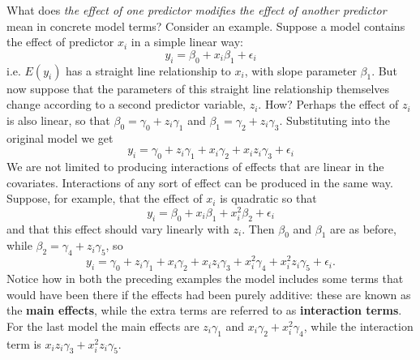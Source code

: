 \documentclass[10pt] {article}
\theoremstyle{definition}
\begin{document}
What does {\em  the effect of one predictor modifies the effect of another predictor} mean in concrete model terms? Consider an example. Suppose a model contains the effect of predictor $x_i$ in a simple linear way:
$$
y_i = \beta_0 + x_i \beta_1 + \epsilon_i
$$    
i.e. $E(y_i)$ has a straight line relationship to $x_i$, with slope parameter $\beta_1$. But now suppose that the parameters of this straight line relationship themselves change according to a second predictor variable, $z_i$. How? Perhaps the effect of $z_i$ is also linear, so that $\beta_0 = \gamma_0 + z_i \gamma_1$ and $\beta_1 = \gamma_2 + z_i \gamma_3$. Substituting into the original model we get
$$
y_i = \gamma_0 + z_i \gamma_1 + x_i \gamma_2  +  x_i z_i \gamma_3 + \epsilon_i
$$  
We are not limited to producing interactions of effects that are linear in the covariates. Interactions of any sort of effect can be produced in the same way. Suppose, for example, that the effect of $x_i$ is quadratic so that 
$$
y_i = \beta_0 + x_i \beta_1 +  x_i^2 \beta_2  + \epsilon_i
$$
and that this effect should vary linearly with $z_i$. Then $\beta_0$ and $\beta_1$ are as before, while $\beta_2 = \gamma_4 + z_i \gamma_5$, so
$$
y_i = \gamma_0 + z_i \gamma_1 + x_i \gamma_2  +  x_i z_i \gamma_3 + x_i^2 \gamma_4 + x_i^2 z_i \gamma_5 + \epsilon_i.
$$
Notice how in both the preceding examples the model includes some terms that would have been there if the effects had been purely additive: these are known as the {\bf main effects}, while the extra terms are referred to as {\bf interaction terms}. For the last model the main effects are $z_i \gamma_1$ and $ x_i \gamma_2+ x_i^2 \gamma_4$, while the interaction term is $x_i z_i \gamma_3 + x_i^2 z_i \gamma_5$.
\end{document}
